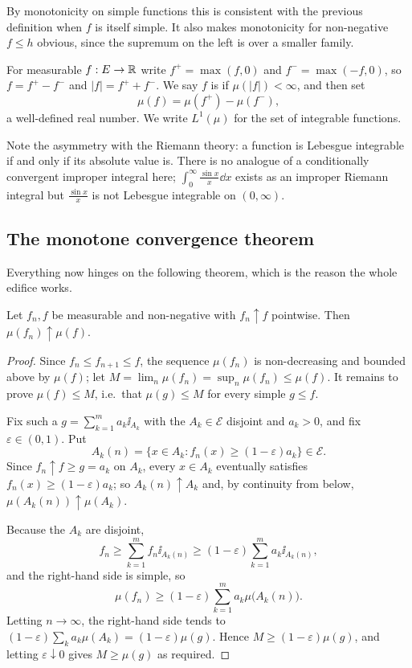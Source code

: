\documentclass[a4paper]{scrartcl}
\newcommand{\cE}{\mathcal{E}}
\newcommand{\ind}{\ii}
\begin{document}
By monotonicity on simple functions this is consistent with the previous definition when $f$ is itself simple. It also makes monotonicity for non-negative $f \leq h$ obvious, since the supremum on the left is over a smaller family.

\begin{definition}
	For measurable $f : E \to \mathbb{R}$ write $f^+ = \max(f, 0)$ and $f^- = \max(-f, 0)$, so $f = f^+ - f^-$ and $|f| = f^+ + f^-$. We say $f$ is  if $\mu(|f|) < \infty$, and then set
	$$
	\mu(f) = \mu(f^+) - \mu(f^-),
	$$
	a well-defined real number. We write $L^1(\mu)$ for the set of integrable functions.
\end{definition}

Note the asymmetry with the Riemann theory: a function is Lebesgue integrable if and only if its absolute value is. There is no analogue of a conditionally convergent improper integral here; $\int_0^\infty \frac{\sin x}{x}\dd x$ exists as an improper Riemann integral but $\frac{\sin x}{x}$ is not Lebesgue integrable on $(0,\infty)$.

\subsection{The monotone convergence theorem}

Everything now hinges on the following theorem, which is the reason the whole edifice works.

\begin{theorem}\label{thm:mct}
	Let $f_n, f$ be measurable and non-negative with $f_n \uparrow f$ pointwise. Then $\mu(f_n) \uparrow \mu(f)$.
\end{theorem}
\begin{proof}
	Since $f_n \leq f_{n+1} \leq f$, the sequence $\mu(f_n)$ is non-decreasing and bounded above by $\mu(f)$; let $M = \lim_n \mu(f_n) = \sup_n \mu(f_n) \leq \mu(f)$. It remains to prove $\mu(f) \leq M$, i.e.\ that $\mu(g) \leq M$ for every simple $g \leq f$.

	Fix such a $g = \sum_{k=1}^m a_k \ind_{A_k}$ with the $A_k \in \cE$ disjoint and $a_k > 0$, and fix $\varepsilon \in (0,1)$. Put
	$$
	A_k(n) = \{ x \in A_k : f_n(x) \geq (1-\varepsilon)a_k \} \in \cE.
	$$
	Since $f_n \uparrow f \geq g = a_k$ on $A_k$, every $x \in A_k$ eventually satisfies $f_n(x) \geq (1-\varepsilon)a_k$; so $A_k(n) \uparrow A_k$ and, by continuity from below, $\mu(A_k(n)) \uparrow \mu(A_k)$.

	Because the $A_k$ are disjoint,
	$$
	f_n \geq \sum_{k=1}^m f_n \ind_{A_k(n)} \geq (1-\varepsilon)\sum_{k=1}^m a_k \ind_{A_k(n)},
	$$
	and the right-hand side is simple, so
	$$
	\mu(f_n) \geq (1-\varepsilon)\sum_{k=1}^m a_k \mu\big(A_k(n)\big).
	$$
	Letting $n \to \infty$, the right-hand side tends to $(1-\varepsilon)\sum_k a_k \mu(A_k) = (1-\varepsilon)\mu(g)$. Hence $M \geq (1-\varepsilon)\mu(g)$, and letting $\varepsilon \downarrow 0$ gives $M \geq \mu(g)$ as required.
\end{proof}
\end{document}
